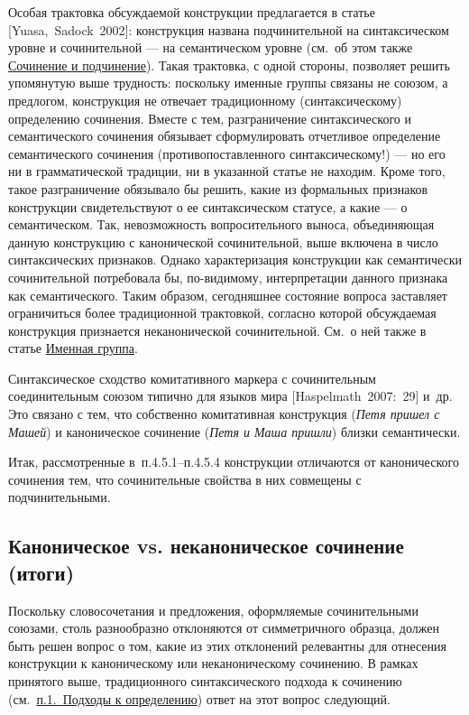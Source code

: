Особая трактовка обсуждаемой конструкции предлагается в статье
{[}Yuasa,~Sadock~2002{]}: конструкция названа подчинительной на
синтаксическом уровне и сочинительной --- на семантическом уровне (см.~об
этом также \underline{Сочинение и подчинение}). Такая трактовка, с одной
стороны, позволяет решить упомянутую выше трудность: поскольку именные
группы связаны не союзом, а предлогом, конструкция не отвечает
традиционному (синтаксическому) определению сочинения. Вместе с тем,
разграничение синтаксического и семантического сочинения обязывает
сформулировать отчетливое определение семантического сочинения
(противопоставленного синтаксическому!) --- но его ни в грамматической
традиции, ни в указанной статье не находим. Кроме того, такое
разграничение обязывало бы решить, какие из формальных признаков
конструкции свидетельствуют о ее синтаксическом статусе, а какие --- о
семантическом. Так, невозможность вопросительного выноса, объединяющая
данную конструкцию с канонической сочинительной, выше включена в число
синтаксических признаков. Однако характеризация конструкции как
семантически сочинительной потребовала бы, по-видимому, интерпретации
данного признака как семантического. Таким образом, сегодняшнее
состояние вопроса заставляет ограничиться более традиционной трактовкой,
согласно которой обсуждаемая конструкция признается неканонической
сочинительной. См.~о ней также в статье \underline{Именная группа}.

Синтаксическое сходство комитативного маркера с сочинительным
соединительным союзом типично для языков мира {[}Haspelmath~2007:~29{]}
и~др. Это связано с тем, что собственно комитативная конструкция
(\textit{Петя пришел с Машей}) и каноническое сочинение (\textit{Петя и Маша
  пришли}) близки семантически.

Итак, рассмотренные в~п.4.5.1--п.4.5.4 конструкции отличаются от
канонического сочинения тем, что сочинительные свойства в них совмещены
с подчинительными.

\subsection{Каноническое vs. неканоническое сочинение
  (итоги)}\label{ux43aux430ux43dux43eux43dux438ux447ux435ux441ux43aux43eux435-vs.-ux43dux435ux43aux430ux43dux43eux43dux438ux447ux435ux441ux43aux43eux435-ux441ux43eux447ux438ux43dux435ux43dux438ux435-ux438ux442ux43eux433ux438}

Поскольку словосочетания и предложения, оформляемые сочинительными
союзами, столь разнообразно отклоняются от симметричного образца, должен
быть решен вопрос о том, какие из этих отклонений релевантны для
отнесения конструкции к каноническому или неканоническому сочинению. В
рамках принятого выше, традиционного синтаксического подхода к сочинению
(см.~\underline{п.1.~Подходы к определению}) ответ на этот вопрос
следующий.

